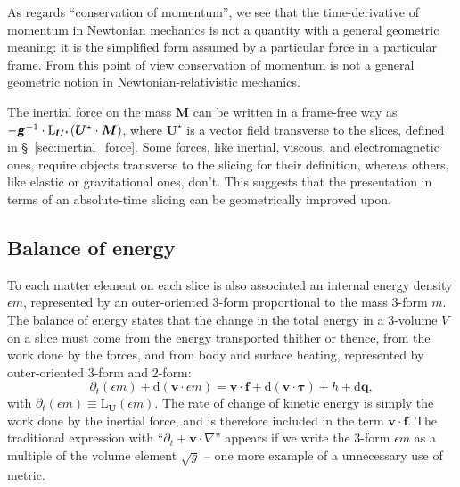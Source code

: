 \documentclass[\ifafour a4paper,12pt,\else a5paper,10pt,\fi%
onecolumn,oneside,article,%
british%
]{memoir}
\theoremstyle{remark}
\theoremstyle{innote}
\newcommand*{\mathte}[1]{\textbf{\textit{\textsf{#1}}}}
\newcommand*{\de}{\partialup}%
\newcommand*{\di}{\mathrm{d}}%
\renewcommand*{\|}{\nonscript\,\vert\nonscript\;\mathopen{}}
\newcommand*{\sect}{\S}%
\newcommand*{\Li}{\mathrm{L}}
\newcommand*{\ydd}{m}
\newcommand*{\yd}{\ydd}
\newcommand*{\yrr}{M}
\newcommand*{\yr}{\bm{\yrr}}
\newcommand*{\yQ}{h}
\newcommand*{\yqq}{q}
\newcommand*{\yq}{\bm{\yqq}}
\newcommand*{\yTT}{\tau}
\newcommand*{\yT}{\bm{\yTT}}
\newcommand*{\ybb}{f}
\newcommand*{\yb}{\bm{\ybb}}
\newcommand*{\yvvt}{v}
\newcommand*{\yvt}{\bm{\yvvt}}
\newcommand*{\yFF}{U}
\newcommand*{\yF}{\bm{\yFF}}
\newcommand*{\yFi}{\yF^{\mathord{\star}}}
\newcommand*{\ygg}{g}
\newcommand*{\yg}{\mathte{\ygg}}
\newcommand*{\ygv}{\sqrt{\ygg}}
\newcommand*{\ye}{\epsilon}
\newcommand*{\ynab}{\nabla}
\newcommand*{\yvo}{V}
\begin{document}
As regards \enquote{conservation of momentum}, we see that the
time-derivative of momentum in Newtonian mechanics is not a quantity with a
general geometric meaning: it is the simplified form assumed by a
particular force in a particular frame. From this point of view
conservation of momentum is not a general geometric notion in
Newtonian-relativistic mechanics.




The inertial force on the mass $\yr$ can be written in a frame-free way as
$-\yg^{-1}\cdot \Li_{\yFi}(\yFi\cdot\yr)$, where $\yFi$ is a vector field
transverse to the slices, defined in \sect~\ref{sec:inertial_force}. Some
forces, like inertial, viscous, and electromagnetic ones, require objects
transverse to the slicing for their definition, whereas others, like
elastic or gravitational ones, don't. This suggests that the presentation
in terms of an absolute-time slicing can be geometrically improved upon.


\subsection{Balance of energy}
\label{sec:energy_balance}

To each matter element on each slice is also associated an internal energy
density $\ye\yd$, represented by an outer-oriented 3-form proportional to
the mass 3-form $\yd$. The balance of energy states that the change in the
total energy in a 3-volume $\yvo$ on a slice must come from the energy
transported thither or thence, from the work done by the forces, and from
body and surface heating, represented by outer-oriented 3-form and 2-form:
\begin{equation}
  \label{eq:balance_energy_traditional}
  \de_t(\ye\yd) + \di(\yvt \cdot \ye\yd) =
  \yvt\cdot\yb + \di(\yvt\cdot \yT)
  +\yQ + \di\yq,
\end{equation}
with $\de_t(\ye\yd) \equiv \Li_{\yF}(\ye\yd)$. The rate of change of
kinetic energy is simply the work done by the inertial force, and is
therefore included in the term $\yvt \cdot \yb$. The traditional expression
with \enquote{$\de_t + \yvt\cdot\ynab$} appears if we write the 3-form
$\ye\yd$ as a multiple of the volume element $\ygv$ -- one more example of
a unnecessary use of metric.
\end{document}

